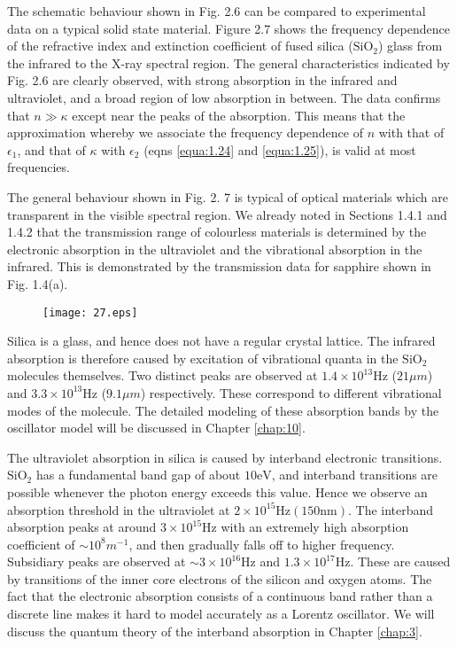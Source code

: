 \documentclass[12pt]{book}
\begin{document}
The schematic behaviour shown in Fig. 2.6 can be compared to experimental data on a typical solid state material. Figure 2.7 shows the frequency dependence of the refractive index and extinction coefficient of fused silica ($\mathrm{SiO_2}$) glass from the infrared to the X-ray spectral region. The general characteristics indicated by Fig. 2.6 are clearly observed, with strong absorption in the infrared and ultraviolet, and a broad region of low absorption in between. The data confirms that $n\gg\kappa$ except near the peaks of the absorption. This means that the approximation whereby we associate the frequency dependence of $n$ with that of $\epsilon_1$, and that of $\kappa$ with $\epsilon_2$ (eqns \ref{equa:1.24} and \ref{equa:1.25}), is valid at most frequencies.

The general behaviour shown in Fig. 2. 7 is typical of optical materials which are transparent in the visible spectral region. We already noted in Sections 1.4.1 and 1.4.2 that the transmission range of colourless materials is determined by the electronic absorption in the ultraviolet and the vibrational absorption in the infrared. This is demonstrated by the transmission data for sapphire shown in Fig. 1.4(a).

\begin{figure}[htbp]
  \texttt{[image: 27.eps]}\\
  \label{fig:2.7}
\end{figure}

Silica is a glass, and hence does not have a regular crystal lattice. The infrared absorption is therefore caused by excitation of vibrational quanta in the $\mathrm{SiO_2}$ molecules themselves. Two distinct peaks are observed at $1.4\times10^{13}$Hz ($21\mu m$) and $3.3\times10^{13}$Hz ($9.1\mu m$) respectively. These correspond to different vibrational modes of the molecule. The detailed modeling of these absorption bands by the oscillator model will be discussed in Chapter \ref{chap:10}.

The ultraviolet absorption in silica is caused by interband electronic transitions. $\mathrm{SiO_2}$ has a fundamental band gap of about $\mathrm{10 eV}$, and interband transitions are possible whenever the photon energy exceeds this value. Hence we observe an absorption threshold in the ultraviolet at $\mathrm{2\times10^{15}Hz (150nm)}$. The interband absorption peaks at around $3\times10^{15}$Hz with an extremely high absorption coefficient of $\sim10^8 m^{-1}$, and then gradually falls off to higher frequency. Subsidiary peaks are observed at $\sim3\times 10^{16}$Hz and $1.3\times10^17$Hz. These are caused by transitions of the inner core electrons of the silicon and oxygen atoms. The fact that the electronic absorption consists of a continuous band rather than a discrete line makes it hard to model accurately as a Lorentz oscillator. We will discuss the quantum theory of the interband absorption in Chapter \ref{chap:3}.
\end{document}

